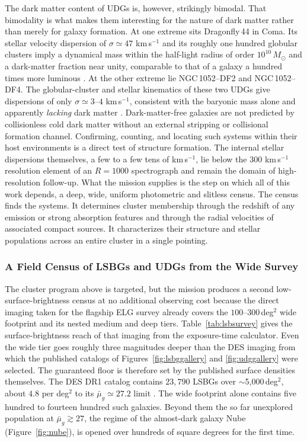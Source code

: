 The dark matter content of UDGs is, however, strikingly bimodal. That bimodality is what makes them interesting for the nature of dark matter rather than merely for galaxy formation. At one extreme sits Dragonfly\,44 in Coma. Its stellar velocity dispersion of $\sigma\simeq47$ km\,s$^{-1}$ and its roughly one hundred globular clusters imply a dynamical mass within the half-light radius of order $10^{10}\,M_\odot$ and a dark-matter fraction near unity, comparable to that of a galaxy a hundred times more luminous \cite{vandokkum2016df44}. At the other extreme lie NGC\,1052--DF2 and NGC\,1052--DF4. The globular-cluster and stellar kinematics of these two UDGs give dispersions of only $\sigma\simeq3$--$4$ km\,s$^{-1}$, consistent with the baryonic mass alone and apparently \emph{lacking} dark matter \cite{vandokkum2018df2,vandokkum2019df4}. Dark-matter-free galaxies are not predicted by collisionless cold dark matter without an external stripping or collisional formation channel. Confirming, counting, and locating such systems within their host environments is a direct test of structure formation. The internal stellar dispersions themselves, a few to a few tens of km\,s$^{-1}$, lie below the $300$ km\,s$^{-1}$ resolution element of an $R=1000$ spectrograph and remain the domain of high-resolution follow-up. What the mission supplies is the step on which all of this work depends, a deep, wide, uniform photometric and slitless census. The census finds the systems. It determines cluster membership through the redshift of any emission or strong absorption features and through the radial velocities of associated compact sources. It characterizes their structure and stellar populations across an entire cluster in a single pointing.

\subsubsection{A Field Census of LSBGs and UDGs from the Wide Survey}

The cluster program above is targeted, but the mission produces a second low-surface-brightness census at no additional observing cost because the direct imaging taken for the flagship ELG survey already covers the $100$--$300$\,deg$^2$ wide footprint and its nested medium and deep tiers. Table~\ref{tab:lsbsurvey} gives the surface-brightness reach of that imaging from the exposure-time calculator. Even the wide tier goes roughly three magnitudes deeper than the DES imaging from which the published catalogs of Figures~\ref{fig:lsbggallery} and \ref{fig:udggallery} were selected. The guaranteed floor is therefore set by the published surface densities themselves. The DES DR1 catalog contains $23{,}790$ LSBGs over $\sim$5{,}000\,deg$^2$, about $4.8$ per deg$^2$ to its $\bar\mu_g\simeq27.2$ limit \cite{tanoglidis2021}. The wide footprint alone contains five hundred to fourteen hundred such galaxies. Beyond them the so far unexplored population at $\bar\mu_g\gtrsim27$, the regime of the almost-dark galaxy Nube (Figure~\ref{fig:nube}), is opened over hundreds of square degrees for the first time.

